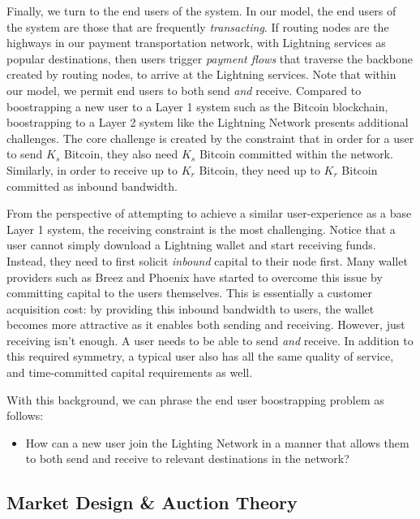 \documentclass[10pt,a4paper]{article}
\theoremstyle{definition}
\begin{document}
Finally, we turn to the end users of the system. In our model, the end users of
the system are those that are frequently \emph{transacting}. If routing nodes
are the highways in our payment transportation network, with Lightning
services as popular destinations, then users trigger \emph{payment flows} that
traverse the backbone created by routing nodes, to arrive at the Lightning
services. Note that within our model, we permit end users to both send
\emph{and} receive. Compared to boostrapping a new user to a Layer 1 system
such as the Bitcoin blockchain, boostrapping to a Layer 2 system like the
Lightning Network presents additional challenges. The core challenge is created
by the constraint that in order for a user to send $K_s$ Bitcoin, they also
need $K_s$ Bitcoin committed within the network. Similarly, in order to receive
up to $K_r$ Bitcoin, they need up to $K_r$ Bitcoin committed as inbound
bandwidth.

From the perspective of attempting to achieve a similar user-experience as a
base Layer 1 system, the receiving constraint is the most challenging. Notice
that a user cannot simply download a Lightning wallet and start receiving
funds. Instead, they need to first solicit \emph{inbound} capital to their node
first. Many wallet providers such as Breez and Phoenix have started to overcome
this issue by committing capital to the users themselves. This is essentially a
customer acquisition cost: by providing this inbound bandwidth to users, the
wallet becomes more attractive as it enables both sending and receiving.
However, just receiving isn't enough.  A user needs to be able to send
\emph{and} receive. In addition to this required symmetry, a typical user also
has all the same quality of service, and time-committed capital requirements as
well.

With this background, we can phrase the end user boostrapping problem as
follows:

\begin{itemize}
        \item How can a new user join the Lighting Network in a manner that
            allows them to both send and receive to relevant destinations in
            the network?
\end{itemize}


\subsection{Market Design \& Auction Theory}
\end{document}

